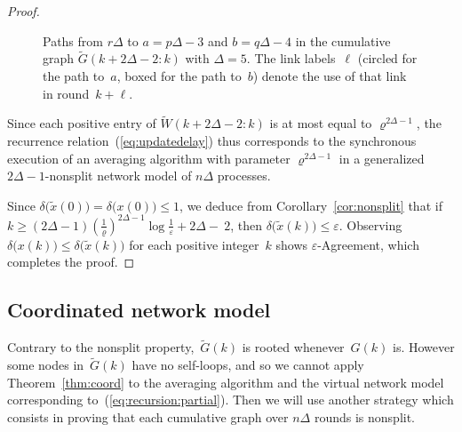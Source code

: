 \documentclass[a4paper]{article}
\theoremstyle{newthm}
\renewcommand{\leq}{\leqslant}
\renewcommand{\geq}{\geqslant}
\begin{document}
\begin{proof}
\begin{figure}
\caption{Paths from $r\Delta$ to $a = p\Delta-3$ and $b = q\Delta - 4$ in
	the cumulative  graph $\tilde{G}(k+2\Delta -2 : k)$  with $\Delta=5$.
The link labels~$\ell$ (circled for the path to~$a$, boxed for
the path to~$b$)  denote the use of that link in round~$k+\ell$.}
\label{fig:ofMatthias}
\end{figure}
	
Since each positive entry of 
	$\tilde{W}(k+2\Delta-2:k)$ is at most equal to  $\varrho^{2 \Delta -1}$,
	 the recurrence relation~(\ref{eq:updatedelay}) thus corresponds to
	the synchronous execution of an averaging  algorithm with
	parameter $\varrho^{2 \Delta -1}$ in a generalized
	$2 \Delta -1$-nonsplit network model of $n\Delta$ processes.

Since $\delta\big( \tilde{x}(0) \big) = \delta\big( x(0) \big) \leq 1$, we deduce from Corollary~\ref{cor:nonsplit} that 
	 if   
	$k \geq (2\Delta \! - \!1) \left( \frac{1}{\varrho} \right)^{2\Delta \!- \!1} \!\! \log \frac{1}{\varepsilon} + 2\Delta -~2$,
	then     $\delta\big( \tilde{x}(k) \big) \leq \varepsilon $.
Observing $\delta\big( x(k) \big) \leq \delta\big( \tilde{x}(k)\big)$ for each positive integer~$k$ 
	shows $\varepsilon$-Agreement, which completes the proof.	
\end{proof}

\subsection{Coordinated network model}

Contrary to the nonsplit property,~$\tilde{G}(k)$ is rooted whenever~$G(k)$ is.
However some nodes in~$\tilde{G}(k)$ have no self-loops, and so we cannot apply
	Theorem~\ref{thm:coord} to the averaging algorithm and the virtual network model   corresponding to~(\ref{eq:recursion:partial}).
Then we will use another strategy which consists in proving that  each cumulative graph over $n\Delta$ 
	rounds is nonsplit. 
	
\end{document}
